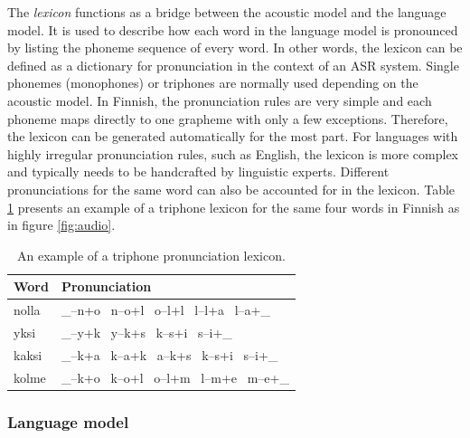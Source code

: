 \documentclass[english, 12pt, a4paper, pdftex, elec, utf8]{aaltothesis}
\begin{document}
The \textit{lexicon} functions as a bridge between the acoustic model and the language model. It is used to describe how each word in the language model is pronounced by listing the phoneme sequence of every word. In other words, the lexicon can be defined as a dictionary for pronunciation in the context of an ASR system. Single phonemes (monophones) or triphones are normally used depending on the acoustic model. In Finnish, the pronunciation rules are very simple and each phoneme maps directly to one grapheme with only a few exceptions. Therefore, the lexicon can be generated automatically for the most part. For languages with highly irregular pronunciation rules, such as English, the lexicon is more complex and typically needs to be handcrafted by linguistic experts. Different pronunciations for the same word can also be accounted for in the lexicon. Table \ref{table:triphone} presents an example of a triphone lexicon for the same four words in Finnish as in figure \ref{fig:audio}. \\
\begin{table}[h]
	\renewcommand{\arraystretch}{1.2}  %
	\setlength{\tabcolsep}{20pt}       %
	\centering
	\caption{An example of a triphone pronunciation lexicon.}
	\label{table:triphone}
	\begin{tabular}{@{}ll@{}}
		\toprule
		\textbf{Word}  & \textbf{Pronunciation}              \\ \midrule
		nolla & \_--n+o \ n--o+l \ o--l+l \ l--l+a \ l--a+\_ \\
		yksi  & \_--y+k \ y--k+s \ k--s+i \ s--i+\_       	 \\
		kaksi & \_--k+a \ k--a+k \ a--k+s \ k--s+i \ s--i+\_ \\
		kolme & \_--k+o \ k--o+l \ o--l+m \ l--m+e \ m--e+\_ \\ \bottomrule
	\end{tabular}
\end{table}

\subsubsection{Language model}
\end{document}
